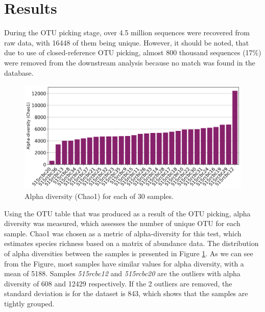 \documentclass[12pt,twocolumn]{article} %
\begin{document}
\section{Results} 
During the OTU picking stage, over 4.5 million sequences were recovered from raw data, with 16448 of them being unique. However, it should be noted, that due to use of closed-reference OTU picking, almost 800 thousand sequences (17\%) were removed from the downstream analysis because no match was found in the database. 
\begin{figure}[ht!] %
	\includegraphics[width=\linewidth]{chao1_alpha.png}
	\caption{Alpha diversity (Chao1) for each of 30 samples.}
	\label{fig:alpha_diversity}
\end{figure}
\par
Using the OTU table that was produced as a result of the OTU picking, alpha diversity was measured, which assesses the number of unique OTU for each sample. Chao1 was chosen as a metric of alpha-diversity for this test, which estimates species richness based on a matrix of abundance data. The distribution of alpha diversities between the samples is presented in Figure \ref{fig:alpha_diversity}. As we can see from the Figure, most samples have similar values for alpha diversity, with a mean of 5188. Samples \textit{515rcbc12} and \textit{515rcbc20} are the outliers with alpha diversity of 608 and 12429 respectively. If the 2 outliers are removed, the standard deviation is for the dataset is 843, which shows that the samples are tightly grouped.
\end{document}
